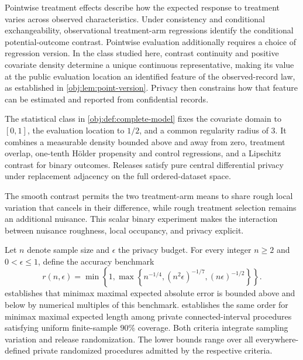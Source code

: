 \documentclass[11pt]{article}
\begin{document}
Pointwise treatment effects describe how the expected response to treatment varies across observed characteristics. Under consistency and conditional exchangeability, observational treatment-arm regressions identify the conditional potential-outcome contrast. Pointwise evaluation additionally requires a choice of regression version. In the class studied here, contrast continuity and positive covariate density determine a unique continuous representative, making its value at the public evaluation location an identified feature of the observed-record law, as established in \cref{obj:lem:point-version}. Privacy then constrains how that feature can be estimated and reported from confidential records.

The statistical class in \cref{obj:def:complete-model} fixes the covariate domain to \([0,1]\), the evaluation location to \(1/2\), and a common regularity radius of \(3\). It combines a measurable density bounded above and away from zero, treatment overlap, one-tenth H\"older propensity and control regressions, and a Lipschitz contrast for binary outcomes. Releases satisfy pure central differential privacy under replacement adjacency on the full ordered-dataset space.

The smooth contrast permits the two treatment-arm means to share rough local variation that cancels in their difference, while rough treatment selection remains an additional nuisance. This scalar binary experiment makes the interaction between nuisance roughness, local occupancy, and privacy explicit.

Let \(n\) denote sample size and \(\epsilon\) the privacy budget. For every integer \(n\ge2\) and \(0<\epsilon\le1\), define the accuracy benchmark
\[
r(n,\epsilon)=
\min\left\{1,\max\left\{
n^{-1/4},(n^2\epsilon)^{-1/7},(n\epsilon)^{-1/2}
\right\}\right\}.
\]
 establishes that minimax maximal expected absolute error is bounded above and below by numerical multiples of this benchmark.  establishes the same order for minimax maximal expected length among private connected-interval procedures satisfying uniform finite-sample \(90\%\) coverage. Both criteria integrate sampling variation and release randomization. The lower bounds range over all everywhere-defined private randomized procedures admitted by the respective criteria.
\end{document}

